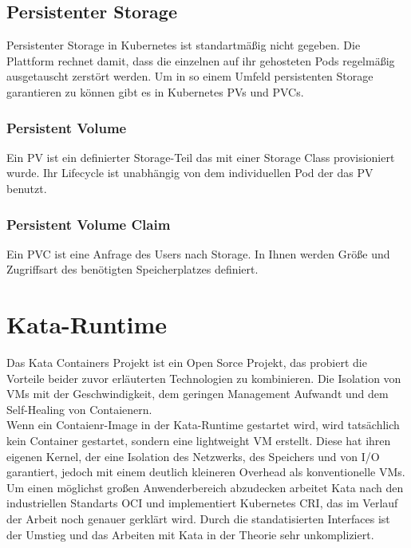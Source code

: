\subsection{Persistenter Storage}
Persistenter Storage in Kubernetes ist standartmäßig nicht gegeben. 
Die Plattform rechnet damit, dass die einzelnen auf ihr gehosteten Pods regelmäßig ausgetauscht zerstört werden. 
Um in so einem Umfeld persistenten Storage garantieren zu können gibt es in Kubernetes \ac{PV}s und \ac{PVC}s.

\subsubsection{Persistent Volume}
Ein \ac{PV} ist ein definierter Storage-Teil das mit einer Storage Class provisioniert wurde.
Ihr Lifecycle ist unabhängig von dem individuellen Pod der das \ac{PV} benutzt.

\subsubsection{Persistent Volume Claim}
Ein \ac{PVC} ist eine Anfrage des Users nach Storage.
In Ihnen werden Größe und Zugriffsart des benötigten Speicherplatzes definiert. 


\section{Kata-Runtime}
Das Kata Containers Projekt ist ein Open Sorce Projekt, das probiert die Vorteile beider zuvor erläuterten Technologien zu kombinieren.
Die Isolation von \ac{VM}s mit der Geschwindigkeit, dem geringen Management Aufwandt und dem Self-Healing von Contaienern.
\\
Wenn ein Contaienr-Image in der Kata-Runtime gestartet wird, wird tatsächlich kein Container gestartet, sondern eine lightweight \ac{VM} erstellt.
Diese hat ihren eigenen Kernel, der eine Isolation des Netzwerks, des Speichers und von \ac{I/O} garantiert, jedoch mit einem deutlich kleineren Overhead als konventionelle \ac{VM}s.
Um einen möglichst großen Anwenderbereich abzudecken arbeitet Kata nach den industriellen Standarts \ac{OCI} und implementiert Kubernetes \ac{CRI}, das im Verlauf der Arbeit noch genauer gerklärt wird. 
Durch die standatisierten Interfaces ist der Umstieg und das Arbeiten mit Kata in der Theorie sehr unkompliziert. \cite{kata}

